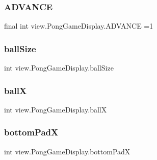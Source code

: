 \subsubsection{\texorpdfstring{A\+D\+V\+A\+N\+CE}{ADVANCE}}
{\footnotesize\ttfamily final int view.\+Pong\+Game\+Display.\+A\+D\+V\+A\+N\+CE =1\hspace{0.3cm}{\ttfamily [private]}}

\hypertarget{classview_1_1_pong_game_display_ae26155e2cdf4f47b164377b7ee3ba3e4}{}\label{classview_1_1_pong_game_display_ae26155e2cdf4f47b164377b7ee3ba3e4} 
\subsubsection{\texorpdfstring{ball\+Size}{ballSize}}
{\footnotesize\ttfamily int view.\+Pong\+Game\+Display.\+ball\+Size\hspace{0.3cm}{\ttfamily [private]}}

\hypertarget{classview_1_1_pong_game_display_aa1f518edcfa598a7ba036567eadf3ae0}{}\label{classview_1_1_pong_game_display_aa1f518edcfa598a7ba036567eadf3ae0} 
\subsubsection{\texorpdfstring{ballX}{ballX}}
{\footnotesize\ttfamily int view.\+Pong\+Game\+Display.\+ballX\hspace{0.3cm}{\ttfamily [private]}}

\hypertarget{classview_1_1_pong_game_display_a195949e482e01530f0c8c876bbf88e6a}{}\label{classview_1_1_pong_game_display_a195949e482e01530f0c8c876bbf88e6a} 
\subsubsection{\texorpdfstring{bottom\+PadX}{bottomPadX}}
{\footnotesize\ttfamily int view.\+Pong\+Game\+Display.\+bottom\+PadX\hspace{0.3cm}{\ttfamily [private]}}

